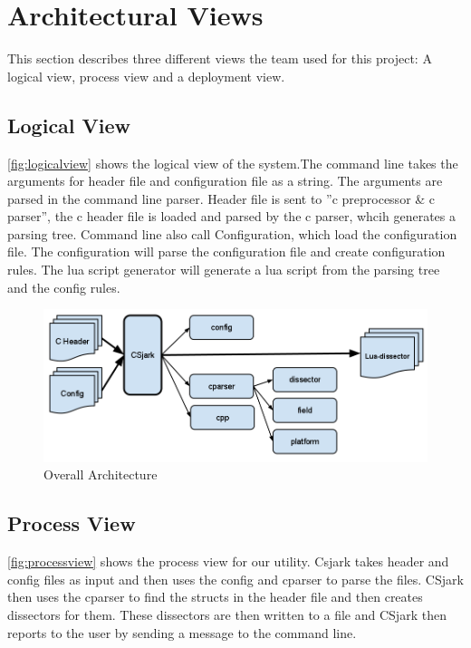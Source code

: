 \section{Architectural Views}
This section describes three different views the team used for this project: A logical view, process view and a deployment view.

\subsection{Logical View}
\autoref{fig:logicalview} shows the logical view of the system.The command line takes the arguments for \gls{header} file and configuration file as a string. The arguments are parsed in the command line \gls{parser}. Header file is sent to ''\Gls{c} \gls{preprocessor} \& \Gls{c} \gls{parser}'', the \Gls{c} \gls{header} file is loaded and parsed by the \Gls{c} \gls{parser}, whcih generates a parsing tree. Command line also call Configuration, which load the configuration file. The configuration will parse the configuration file and create configuration rules. The \Gls{lua} \gls{script} generator will generate a \Gls{lua} \gls{script} from the parsing tree and the config rules.

\begin{figure}[htb]
	\includegraphics[width=\textwidth]{./planning/img/final_arch}
	\caption{Overall Architecture\label{fig:logicalview}}
\end{figure}

\subsection{Process View}
\autoref{fig:processview} shows the process view for our \gls{utility}. Csjark takes \gls{header} and config files as input and then uses the config and cparser to parse the files. CSjark then uses the cparser to find the \glspl{struct} in the \gls{header} file and then creates \glspl{dissector} for them. These \glspl{dissector} are then written to a file and CSjark then reports to the user by sending a message to the command line.


